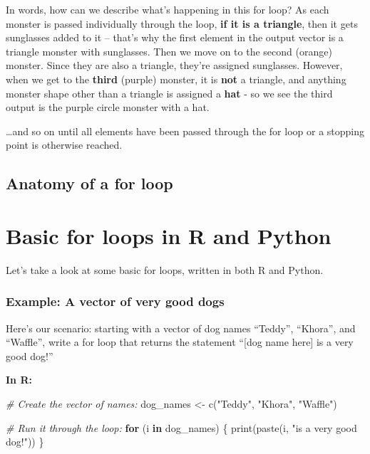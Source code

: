\documentclass[
]{book}
\newenvironment{Shaded}{\begin{snugshade}}{\end{snugshade}}
\newcommand{\CommentTok}[1]{\textcolor[rgb]{0.56,0.35,0.01}{\textit{#1}}}
\newcommand{\ControlFlowTok}[1]{\textcolor[rgb]{0.13,0.29,0.53}{\textbf{#1}}}
\newcommand{\FunctionTok}[1]{\textcolor[rgb]{0.00,0.00,0.00}{#1}}
\newcommand{\NormalTok}[1]{#1}
\newcommand{\OtherTok}[1]{\textcolor[rgb]{0.56,0.35,0.01}{#1}}
\newcommand{\StringTok}[1]{\textcolor[rgb]{0.31,0.60,0.02}{#1}}
\begin{document}
In words, how can we describe what's happening in this for loop? As each monster is passed individually through the loop, \textbf{if it is a triangle}, then it gets sunglasses added to it -- that's why the first element in the output vector is a triangle monster with sunglasses. Then we move on to the second (orange) monster. Since they are also a triangle, they're assigned sunglasses. However, when we get to the \textbf{third} (purple) monster, it is \textbf{not} a triangle, and anything monster shape other than a triangle is assigned a \textbf{hat} - so we see the third output is the purple circle monster with a hat.

\ldots and so on until all elements have been passed through the for loop or a stopping point is otherwise reached.

\hypertarget{anatomy-of-a-for-loop}{%
\subsection{Anatomy of a for loop}\label{anatomy-of-a-for-loop}}

\hypertarget{basic-for-loops-in-r-and-python}{%
\section{Basic for loops in R and Python}\label{basic-for-loops-in-r-and-python}}

Let's take a look at some basic for loops, written in both R and Python.

\hypertarget{example-a-vector-of-very-good-dogs}{%
\subsubsection{Example: A vector of very good dogs}\label{example-a-vector-of-very-good-dogs}}

Here's our scenario: starting with a vector of dog names ``Teddy'', ``Khora'', and ``Waffle'', write a for loop that returns the statement ``{[}dog name here{]} is a very good dog!''

\textbf{In R:}

\begin{Shaded}
\begin{Highlighting}[]
\CommentTok{\# Create the vector of names:}
\NormalTok{dog\_names }\OtherTok{\textless{}{-}} \FunctionTok{c}\NormalTok{(}\StringTok{"Teddy"}\NormalTok{, }\StringTok{"Khora"}\NormalTok{, }\StringTok{"Waffle"}\NormalTok{)}

\CommentTok{\# Run it through the loop:}
\ControlFlowTok{for}\NormalTok{ (i }\ControlFlowTok{in}\NormalTok{ dog\_names) \{}
  \FunctionTok{print}\NormalTok{(}\FunctionTok{paste}\NormalTok{(i, }\StringTok{"is a very good dog!"}\NormalTok{))}
\NormalTok{\}}
\end{Highlighting}
\end{Shaded}
\end{document}
